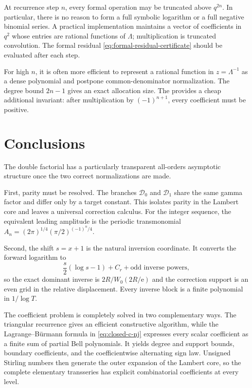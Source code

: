\documentclass[11pt,a4paper,oneside]{article}
\theoremstyle{plain}
\theoremstyle{definition}
\theoremstyle{remark}
\newcommand{\e}{\mathrm e}
\newcommand{\D}{\mathcal D}
\begin{document}
At recurrence step $n$, every formal operation may be truncated above
$q^{2n}$.  In particular, there is no reason to form a full symbolic logarithm
or a full negative binomial series.  A practical implementation maintains a
vector of coefficients in $q^2$ whose entries are rational functions of
$\Lambda$; multiplication is truncated convolution.  The formal residual
\cref{eq:formal-residual-certificate} should be evaluated after each step.

For high $n$, it is often more efficient to represent a rational function in
$z=\Lambda^{-1}$ as a dense polynomial and postpone common-denominator
normalization.  The degree bound $2n-1$ gives an exact allocation size.  The
 provides a cheap additional invariant: after
multiplication by $(-1)^{n+1}$, every coefficient must be positive.

\section{Conclusions}
\label{sec:conclusion}

The double factorial has a particularly transparent all-orders asymptotic
structure once the two correct normalizations are made.

First, parity must be resolved.  The branches $\D_0$ and $\D_1$ share the same
gamma factor and differ only by a target constant.  This isolates parity in
the Lambert core and leaves a universal correction calculus.  For the integer
sequence, the equivalent leading amplitude is the periodic transmonomial
$A_n=(2\pi)^{1/4}(\pi/2)^{(-1)^n/4}$.

Second, the shift $s=x+1$ is the natural inversion coordinate.  It converts the
forward logarithm to
\[
 \frac{s}{2}(\log s-1)+C_r+\text{odd inverse powers},
\]
so the exact dominant inverse is $2R/W_0(2R/\e)$ and the correction support is
an even grid in the relative displacement.  Every inverse block is a finite
polynomial in $1/\log T$.

The coefficient problem is completely solved in two complementary ways.  The
triangular recurrence gives an efficient constructive algorithm, while the
Lagrange--B\"urmann formula in \cref{eq:closed-c-nj} expresses every scalar
coefficient as a finite sum of partial Bell polynomials.  It yields degree and
support bounds, boundary coefficients, and the coefficientwise alternating
sign law.  Unsigned Stirling numbers then generate the outer expansion of the
Lambert core, so the complete elementary transseries has explicit
combinatorial coefficients at every level.
\end{document}
